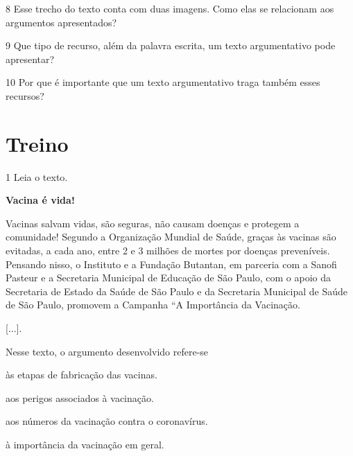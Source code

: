 \pagebreak
\num{8} Esse trecho do texto conta com duas imagens. Como elas se
relacionam aos argumentos apresentados?


\num{9} Que tipo de recurso, além da palavra escrita, um texto argumentativo
pode apresentar?


\num{10} Por que é importante que um texto argumentativo traga também esses recursos?


\pagebreak
\section*{Treino}

\num{1} Leia o texto.

\begin{myquote}
\textbf{Vacina é vida!}

Vacinas salvam vidas, são seguras, não causam doenças e protegem a
comunidade! Segundo a Organização Mundial de Saúde, graças às vacinas
são evitadas, a cada ano, entre 2 e 3 milhões de mortes por doenças
preveníveis. Pensando nisso, o Instituto e a Fundação Butantan, em
parceria com a Sanofi Pasteur e a Secretaria Municipal de Educação de
São Paulo, com o apoio da Secretaria de Estado da Saúde de São Paulo e
da Secretaria Municipal de Saúde de São Paulo, promovem a Campanha “A
Importância da Vacinação.

{[}...{]}.

\end{myquote}

Nesse texto, o argumento desenvolvido refere-se
\enlargethispage{4\baselineskip}

\begin{escolha}
\item às etapas de fabricação das vacinas.

\item aos perigos associados à vacinação.

\item aos números da vacinação contra o coronavírus.

\item à importância da vacinação em geral.
\end{escolha}


